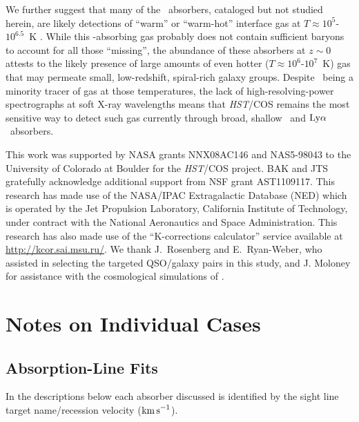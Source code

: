 \documentclass[twocolumn,twocolappendix,tighten,times]{aastex6}
\newcommand{\OVI}{\ion{O}{6}}
\newcommand{\hst}{{\sl HST}}
\newcommand{\kms}{\ensuremath{{\rm km\,s}^{-1}}}
\newcommand{\lya}{\ensuremath{{\rm Ly}\alpha}}
\begin{document}
We further suggest that many of the \OVI\ absorbers, cataloged but not studied 
herein, are likely detections of ``warm'' or ``warm-hot'' interface gas at 
$T \approx10^5$-$10^{6.5}$~K \citep{savage14, stocke14}. While this 
\OVI-absorbing gas probably does not contain sufficient baryons to account for 
all those ``missing'', the abundance of these absorbers at $z\sim0$ 
\citep[$dN/dz\approx4$;][]{stocke14} attests to the likely presence of large 
amounts of even hotter ($T \approx 10^6$-$10^7$~K) gas that may permeate small, 
low-redshift, spiral-rich galaxy groups. Despite \OVI\ being a minority tracer of 
gas at those temperatures, the lack of high-resolving-power spectrographs at soft 
X-ray wavelengths means that \hst/COS remains the most sensitive way to detect 
such gas currently through broad, shallow \OVI\ and \lya\ absorbers.


\acknowledgements

This work was supported by NASA grants NNX08AC146 and NAS5-98043 to
the University of Colorado at Boulder for the \hst/COS project. BAK
and JTS gratefully acknowledge additional support from NSF grant
AST1109117. This research has made use of the NASA/IPAC Extragalactic
Database (NED) which is operated by the Jet Propulsion Laboratory,
California Institute of Technology, under contract with the National
Aeronautics and Space Administration. This research has also made use
of the ``K-corrections calculator'' service available at \url{http://kcor.sai.msu.ru/}. We thank J.~Rosenberg and E.~Ryan-Weber, 
who assisted in selecting the targeted QSO/galaxy pairs in this study, 
and J. Moloney for assistance with the cosmological simulations of 
\citet{shull15}.



\appendix

\section{Notes on Individual Cases}
\label{indiv}


\subsection{Absorption-Line Fits}
\label{indiv:absorbers}

In the descriptions below each absorber discussed is
identified by the sight line target name/recession velocity (\kms).
\end{document}
